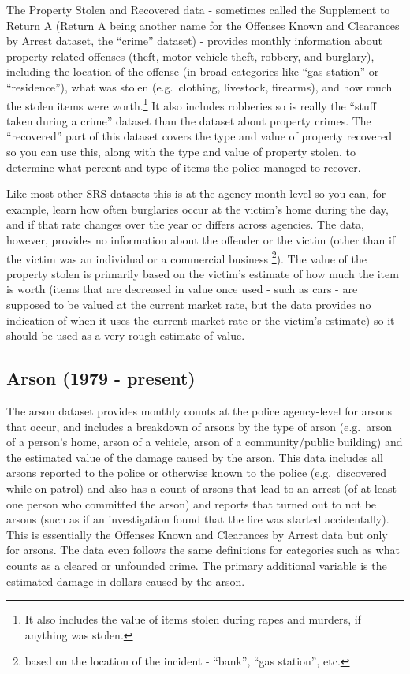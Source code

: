 \documentclass[
]{krantz}
\begin{document}
The Property Stolen and Recovered data - sometimes called
the Supplement to Return A (Return A being another name for
the Offenses Known and Clearances by Arrest dataset, the
``crime'' dataset) - provides monthly information about
property-related offenses (theft, motor vehicle theft,
robbery, and burglary), including the location of the
offense (in broad categories like ``gas station'' or
``residence''), what was stolen (e.g.~clothing, livestock,
firearms), and how much the stolen items were
worth.\footnote{It also includes the value of items stolen
  during rapes and murders, if anything was stolen.} It also
includes robberies so is really the ``stuff taken during a
crime'' dataset than the dataset about property crimes. The
``recovered'' part of this dataset covers the type and value
of property recovered so you can use this, along with the
type and value of property stolen, to determine what percent
and type of items the police managed to recover.

Like most other SRS datasets this is at the agency-month
level so you can, for example, learn how often burglaries
occur at the victim's home during the day, and if that rate
changes over the year or differs across agencies. The data,
however, provides no information about the offender or the
victim (other than if the victim was an individual or a
commercial business \footnote{based on the location of the
  incident - ``bank'', ``gas station'', etc.}). The value of
the property stolen is primarily based on the victim's
estimate of how much the item is worth (items that are
decreased in value once used - such as cars - are supposed
to be valued at the current market rate, but the data
provides no indication of when it uses the current market
rate or the victim's estimate) so it should be used as a
very rough estimate of value.

\subsection{Arson (1979 -
present)}\label{arson-1979---present}

The arson dataset provides monthly counts at the police
agency-level for arsons that occur, and includes a breakdown
of arsons by the type of arson (e.g.~arson of a person's
home, arson of a vehicle, arson of a community/public
building) and the estimated value of the damage caused by
the arson. This data includes all arsons reported to the
police or otherwise known to the police (e.g.~discovered
while on patrol) and also has a count of arsons that lead to
an arrest (of at least one person who committed the arson)
and reports that turned out to not be arsons (such as if an
investigation found that the fire was started accidentally).
This is essentially the Offenses Known and Clearances by
Arrest data but only for arsons. The data even follows the
same definitions for categories such as what counts as a
cleared or unfounded crime. The primary additional variable
is the estimated damage in dollars caused by the arson.
\end{document}
